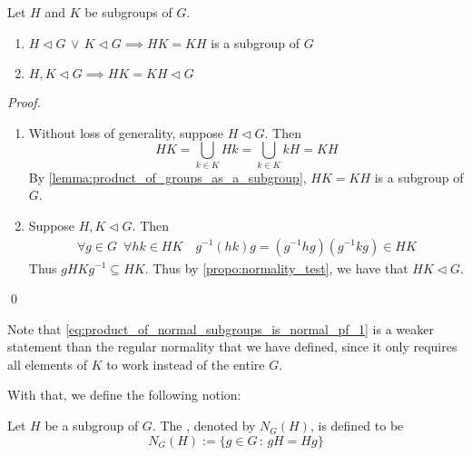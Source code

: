 \begin{propo}
\label{propo:product_of_normal_subgroups_is_normal}
  Let $H$ and $K$ be subgroups of $G$.
  \begin{enumerate}
    \item $H \triangleleft G \, \lor \, K \triangleleft G \implies HK = KH$ is a subgroup of $G$
    \item $H, K \triangleleft G \implies HK = KH \triangleleft G$
  \end{enumerate}
\end{propo}

\begin{proof}
  \begin{enumerate}
    \item Without loss of generality, suppose $H \triangleleft G$. Then
      \begin{equation}\label{eq:product_of_normal_subgroups_is_normal_pf_1}
        HK = \bigcup_{k \in K} Hk = \bigcup_{k \in K} kH = KH
      \end{equation}
      By \cref{lemma:product_of_groups_as_a_subgroup}, $HK = KH$ is a subgroup of $G$.

    \item Suppose $H, K \triangleleft G$. Then
      \begin{align*}
        \forall g \in G \enspace \forall hk \in HK \quad g^{-1}( hk )g = (g^{-1} hg)(g^{-1} k g) \in HK
      \end{align*}
      Thus $gHKg^{-1} \subseteq HK$. Thus by \cref{propo:normality_test}, we have that $HK \triangleleft G$.
  \end{enumerate}\qed
\end{proof}

\begin{note}
  Note that \cref{eq:product_of_normal_subgroups_is_normal_pf_1} is a weaker statement than the regular normality that we have defined, since it only requires all elements of $K$ to work instead of the entire $G$.
\end{note}

With that, we define the following notion:

\begin{defn}[Normalizer]
\label{defn:normalizer}
  Let $H$ be a subgroup of $G$. The , denoted by $N_G(H)$, is defined to be
  \begin{equation*}
    N_G(H) := \{ g \in G \, : \, gH = Hg \}
  \end{equation*}
\end{defn}

